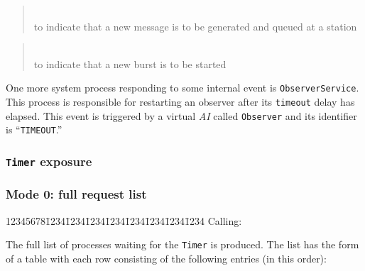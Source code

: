 \medskip

\begin{quote}
\noindent{}\\ \hspace{0in}
to indicate that a new message is to be generated and queued at a station
\end{quote}

\begin{quote}
\noindent{}\\ \hspace{0in}
to indicate that a new burst is to be started
\end{quote}\medskip

One more system process responding to some internal event is
{\tt ObserverService}.
This process is responsible for restarting an observer after its
{\tt timeout} delay has elapsed.
This event is triggered by a virtual {\em AI\/} called {\tt Observer} and
its identifier is ``{\tt TIMEOUT}.''

\subsubsection{{\tt Timer} exposure}
\label{rm_ex_se_ti}
\noindent
\subsubsection*{Mode 0: full request list}
{\tt\begin{tabbing}
12345678\=1234\=1234\=1234\=1234\=1234\=1234\=1234\=1234\kill
{\rm Calling:}
\end{tabbing}}

The full list of processes waiting for the {\tt Timer} is produced.
The list has the form of a table with each row consisting of the
following entries (in this order):

